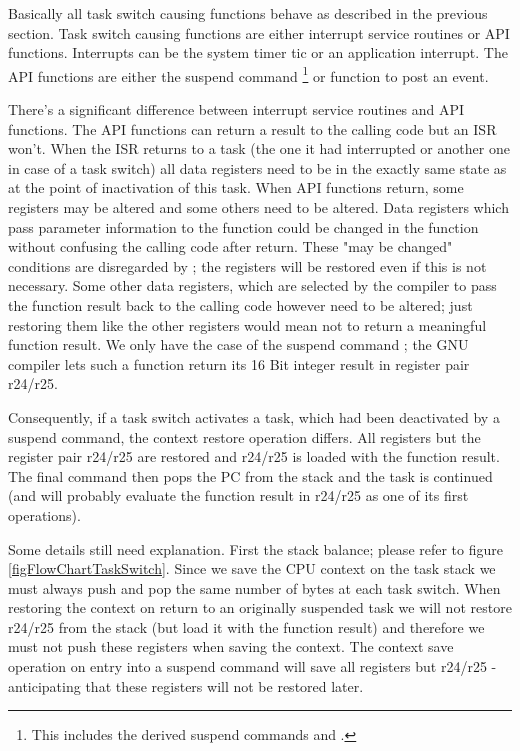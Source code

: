 Basically all task switch causing functions behave as described in the
previous section. Task switch causing functions are either interrupt
service routines or API functions. Interrupts can be the system timer tic
or an application interrupt. The API functions are either the suspend
command \footnote{This includes the derived
suspend commands  and
.} or function  to
post an event.

There's a significant difference between interrupt service routines and
API functions. The API functions can return a result to the calling code
but an ISR won't. When the ISR returns to a task (the one it had
interrupted or another one in case of a task switch) all data registers
need to be in the exactly same state as at the point of inactivation of
this task. When API functions return, some registers may be altered and
some others need to be altered. Data registers which pass parameter
information to the function could be changed in the function without
confusing the calling code after return. These "may be changed" conditions
are disregarded by \rtos; the registers will be restored even if this is
not necessary. Some other data registers, which are selected by the
compiler to pass the function result back to the calling code however need
to be altered; just restoring them like the other registers would mean not
to return a meaningful function result. We only have the case of the
suspend command ; the GNU compiler
lets such a function return its 16 Bit integer result in register pair
r24/r25.

Consequently, if a task switch activates a task, which had been
deactivated by a suspend command, the context restore operation differs.
All registers but the register pair r24/r25 are restored and r24/r25 is
loaded with the function result. The final command  then pops
the PC from the stack and the task is continued (and will probably
evaluate the function result in r24/r25 as one of its first operations).

Some details still need explanation. First the stack balance; please refer
to figure \ref{figFlowChartTaskSwitch}. Since we save the CPU context on
the task stack we must always push and pop the same number of bytes at
each task switch. When restoring the context on return to an originally
suspended task we will not restore r24/r25 from the stack (but load it
with the function result) and therefore we must not push these registers
when saving the context. The context save operation on entry into a
suspend command will save all registers but r24/r25 - anticipating that
these registers will not be restored later.

